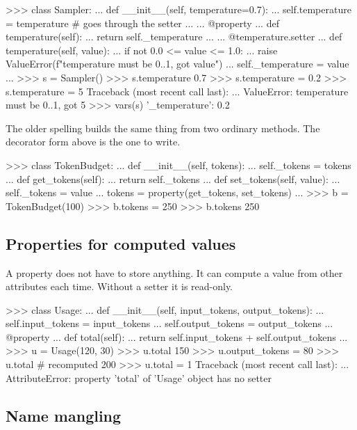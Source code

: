 \begin{pycode}
>>> class Sampler:
...     def __init__(self, temperature=0.7):
...         self.temperature = temperature     # goes through the setter
...
...     @property
...     def temperature(self):
...         return self._temperature
...
...     @temperature.setter
...     def temperature(self, value):
...         if not 0.0 <= value <= 1.0:
...             raise ValueError(f"temperature must be 0..1, got {value}")
...         self._temperature = value
...
>>> s = Sampler()
>>> s.temperature
0.7
>>> s.temperature = 0.2
>>> s.temperature = 5
Traceback (most recent call last):
  ...
ValueError: temperature must be 0..1, got 5
>>> vars(s)
{'_temperature': 0.2}
\end{pycode}

The older spelling builds the same thing from two ordinary methods. The decorator form above is
the one to write.

\begin{pycode}
>>> class TokenBudget:
...     def __init__(self, tokens):
...         self._tokens = tokens
...     def get_tokens(self):
...         return self._tokens
...     def set_tokens(self, value):
...         self._tokens = value
...     tokens = property(get_tokens, set_tokens)
...
>>> b = TokenBudget(100)
>>> b.tokens = 250
>>> b.tokens
250
\end{pycode}

\subsection{Properties for computed values}

A property does not have to store anything. It can compute a value from other attributes each time.
Without a setter it is read-only.

\begin{pycode}
>>> class Usage:
...     def __init__(self, input_tokens, output_tokens):
...         self.input_tokens = input_tokens
...         self.output_tokens = output_tokens
...     @property
...     def total(self):
...         return self.input_tokens + self.output_tokens
...
>>> u = Usage(120, 30)
>>> u.total
150
>>> u.output_tokens = 80
>>> u.total                        # recomputed
200
>>> u.total = 1
Traceback (most recent call last):
  ...
AttributeError: property 'total' of 'Usage' object has no setter
\end{pycode}

\subsection{Name mangling}

